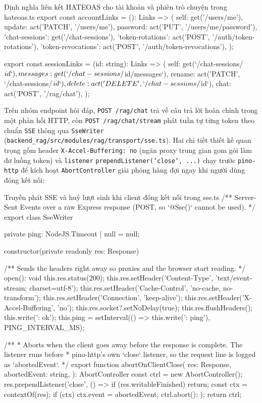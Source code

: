 \begin{tsbox}{Định nghĩa liên kết HATEOAS cho tài khoản và phiên trò chuyện trong hateoas.ts}
export const accountLinks = (): Links => ({
  self: get('/users/me'),
  update: act('PATCH', '/users/me'),
  password: act('PUT', '/users/me/password'),
  'chat-sessions': get('/chat-sessions'),
  'token-rotations': act('POST', '/auth/token-rotations'),
  'token-revocations': act('POST', '/auth/token-revocations'),
});

export const sessionLinks = (id: string): Links => ({
  self: get(`/chat-sessions/${id}`),
  messages: get(`/chat-sessions/${id}/messages`),
  rename: act('PATCH', `/chat-sessions/${id}`),
  delete: act('DELETE', `/chat-sessions/${id}`),
  chat: act('POST', '/rag/chat'),
});
\end{tsbox}

Trên nhóm endpoint hỏi đáp, \texttt{POST /rag/chat} trả về câu trả lời hoàn chỉnh trong một phản hồi HTTP, còn \texttt{POST /rag/chat/stream} phát tuần tự từng token theo chuẩn \texttt{SSE} thông qua \texttt{SseWriter} (\texttt{backend\_\allowbreak{}rag/\allowbreak{}src/\allowbreak{}modules/\allowbreak{}rag/\allowbreak{}transport/\allowbreak{}sse.\allowbreak{}ts}). Hai chi tiết thiết kế quan trọng gồm header \texttt{X-\allowbreak{}Accel-\allowbreak{}Buffering:\allowbreak{} no} (ngăn proxy trung gian gom gói làm đơ luồng token) và \texttt{listener} \texttt{prependListener(\allowbreak{}'close',\allowbreak{} ...)} chạy trước \texttt{pino-http} để kích hoạt \texttt{AbortController} giải phóng hàng đợi ngay khi người dùng đóng kết nối:

\begin{tsbox}{Truyền phát SSE và huỷ lượt sinh khi client đóng kết nối trong sse.ts}
/** Server-Sent Events over a raw Express response (POST, so `@Sse()` cannot be used). */
export class SseWriter {
  private ping: NodeJS.Timeout | null = null;

  constructor(private readonly res: Response) {}

  /** Sends the headers right away so proxies and the browser start reading. */
  open(): void {
    this.res.status(200);
    this.res.setHeader('Content-Type', 'text/event-stream; charset=utf-8');
    this.res.setHeader('Cache-Control', 'no-cache, no-transform');
    this.res.setHeader('Connection', 'keep-alive');
    this.res.setHeader('X-Accel-Buffering', 'no');
    this.res.socket?.setNoDelay(true);
    this.res.flushHeaders();
    this.write(': ok\n\n');
    this.ping = setInterval(() => this.write(': ping\n\n'), PING_INTERVAL_MS);
  }
}

/**
 * Aborts when the client goes away before the response is complete. The listener runs before
 * pino-http's own `close` listener, so the request line is logged as `abortedEvent`.
 */
export function abortOnClientClose(
  res: Response,
  abortedEvent: string,
): AbortController {
  const ctrl = new AbortController();
  res.prependListener('close', () => {
    if (res.writableFinished) return;
    const ctx = contextOf(res);
    if (ctx) ctx.event = abortedEvent;
    ctrl.abort();
  });
  return ctrl;
}
\end{tsbox}

